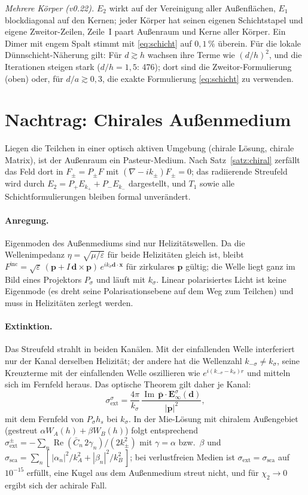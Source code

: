 \documentclass[11pt, a4paper]{article}
\newcommand{\mvec}[1]{\boldsymbol{#1}}
\theoremstyle{plain}
\theoremstyle{definition}
\begin{document}
\emph{Mehrere Körper (v0.22).} $E_2$ wirkt auf der Vereinigung aller Außenflächen, $E_1$ blockdiagonal auf den Kernen; jeder
Körper hat seinen eigenen Schichtstapel und eigene Zweitor-Zeilen, Zeile~I paart Außenraum und Kerne aller Körper. Ein Dimer mit
engem Spalt stimmt mit \eqref{eq:schicht} auf $0{,}1\,\%$ überein. Für die lokale Dünnschicht-Näherung gilt: Für $d\gtrsim h$
wachsen ihre Terme wie $(d/h)^2$, und die Iterationen steigen stark ($d/h=1{,}5$: 476); dort sind die Zweitor-Formulierung
(oben) oder, für $d/a\gtrsim0{,}3$, die exakte Formulierung \eqref{eq:schicht} zu verwenden.

\section{Nachtrag: Chirales Außenmedium}\label{sec:chiralaussen}

Liegen die Teilchen in einer optisch aktiven Umgebung (chirale Lösung, chirale Matrix), ist der Außenraum ein
Pasteur-Medium. Nach Satz~\ref{satz:chiral} zerfällt das Feld dort in $F_\pm=P_\pm F$ mit $(\nabla-ik_\pm)F_\pm=0$; das
radiierende Streufeld wird durch $E_2=P_+E_{k_+}+P_-E_{k_-}$ dargestellt, und $T_1$ sowie alle Schichtformulierungen bleiben
formal unverändert.

\paragraph{Anregung.} Eigenmoden des Außenmediums sind nur Helizitätswellen. Da die Wellenimpedanz
$\eta=\sqrt{\mu/\varepsilon}$ für beide Helizitäten gleich ist, bleibt $F^{\mathrm{inc}}=\sqrt\varepsilon\,(\mvec p+I\,\mvec d\times\mvec p)
\,e^{ik_\sigma\mvec d\cdot\mvec x}$ für zirkulares $\mvec p$ gültig; die Welle liegt ganz im Bild eines Projektors $P_\sigma$ und
läuft mit $k_\sigma$. Linear polarisiertes Licht ist keine Eigenmode (es dreht seine Polarisationsebene auf dem Weg zum
Teilchen) und muss in Helizitäten zerlegt werden.

\paragraph{Extinktion.} Das Streufeld strahlt in beiden Kanälen. Mit der einfallenden Welle interferiert nur der Kanal
derselben Helizität; der andere hat die Wellenzahl $k_{-\sigma}\ne k_\sigma$, seine Kreuzterme mit der einfallenden Welle
oszillieren wie $e^{i(k_{-\sigma}-k_\sigma)r}$ und mitteln sich im Fernfeld heraus. Das optische Theorem gilt daher je Kanal:
\[
  \sigma_{\mathrm{ext}}^{\sigma}=\frac{4\pi}{k_\sigma}\,\frac{\operatorname{Im}\,\bar{\mvec p}\cdot\mvec E_\infty^{\sigma}(\mvec d)}{|\mvec p|^2},
\]
mit dem Fernfeld von $P_\sigma h_s$ bei $k_\sigma$. In der Mie-Lösung mit chiralem Außengebiet (gestreut
$\alpha W_A(h)+\beta W_B(h)$) folgt entsprechend $\sigma_{\mathrm{ext}}^{\pm}=-\sum_n\operatorname{Re}(\bar C_n\,2\gamma_n)/(2k_\pm^2)$ mit
$\gamma=\alpha$ bzw.\ $\beta$ und $\sigma_{\mathrm{sca}}=\sum_n[\,|\alpha_n|^2/k_A^2+|\beta_n|^2/k_B^2\,]$; bei verlustfreien Medien ist
$\sigma_{\mathrm{ext}}=\sigma_{\mathrm{sca}}$ auf $10^{-15}$ erfüllt, eine Kugel aus dem Außenmedium streut nicht, und für
$\chi_2\to0$ ergibt sich der achirale Fall.
\end{document}
